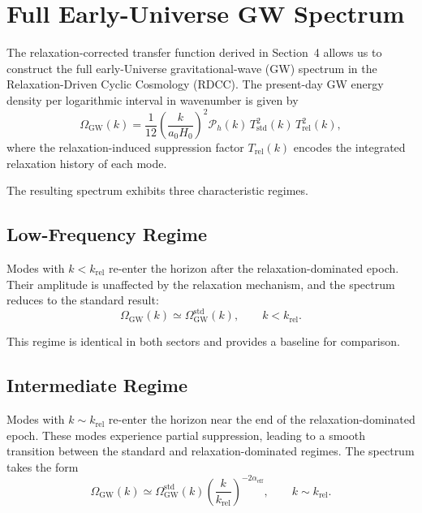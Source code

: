 \documentclass[11pt,a4paper]{article}
\begin{document}
\section{Full Early-Universe GW Spectrum}

The relaxation-corrected transfer function derived in Section~4 allows us to construct the full
early-Universe gravitational-wave (GW) spectrum in the Relaxation-Driven Cyclic Cosmology
(RDCC). The present-day GW energy density per logarithmic interval in wavenumber is given by
\begin{equation}
\Omega_{\mathrm{GW}}(k)
=
\frac{1}{12}
\left( \frac{k}{a_{0} H_{0}} \right)^{2}
\mathcal{P}_{h}(k)\,
T_{\mathrm{std}}^{2}(k)\,
T_{\mathrm{rel}}^{2}(k),
\end{equation}
where the relaxation-induced suppression factor $T_{\mathrm{rel}}(k)$ encodes the integrated
relaxation history of each mode.

The resulting spectrum exhibits three characteristic regimes.


\subsection{Low-Frequency Regime}

Modes with $k < k_{\mathrm{rel}}$ re-enter the horizon after the relaxation-dominated epoch. Their
amplitude is unaffected by the relaxation mechanism, and the spectrum reduces to the standard
result:
\begin{equation}
\Omega_{\mathrm{GW}}(k)
\simeq
\Omega_{\mathrm{GW}}^{\mathrm{std}}(k),
\qquad
k < k_{\mathrm{rel}}.
\end{equation}

This regime is identical in both sectors and provides a baseline for comparison.


\subsection{Intermediate Regime}

Modes with $k \sim k_{\mathrm{rel}}$ re-enter the horizon near the end of the relaxation-dominated
epoch. These modes experience partial suppression, leading to a smooth transition between the
standard and relaxation-dominated regimes. The spectrum takes the form
\begin{equation}
\Omega_{\mathrm{GW}}(k)
\simeq
\Omega_{\mathrm{GW}}^{\mathrm{std}}(k)
\left( \frac{k}{k_{\mathrm{rel}}} \right)^{-2\alpha_{\mathrm{eff}}},
\qquad
k \sim k_{\mathrm{rel}}.
\end{equation}
\end{document}
